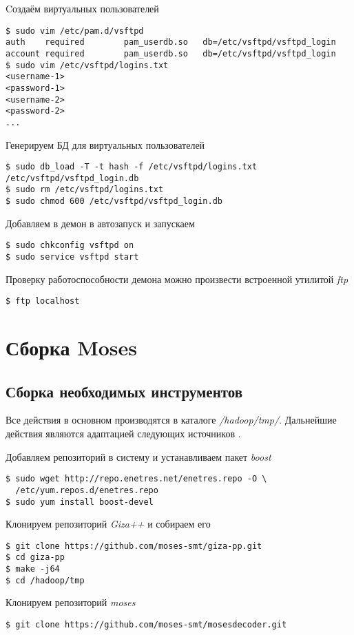 Cоздаём виртуальных пользователей
\begin{lstlisting}
$ sudo vim /etc/pam.d/vsftpd
auth    required        pam_userdb.so   db=/etc/vsftpd/vsftpd_login
account required        pam_userdb.so   db=/etc/vsftpd/vsftpd_login
$ sudo vim /etc/vsftpd/logins.txt
<username-1>
<password-1>
<username-2>
<password-2>
...
\end{lstlisting}

Генерируем БД для виртуальных пользователей
\begin{lstlisting}
$ sudo db_load -T -t hash -f /etc/vsftpd/logins.txt /etc/vsftpd/vsftpd_login.db
$ sudo rm /etc/vsftpd/logins.txt
$ sudo chmod 600 /etc/vsftpd/vsftpd_login.db
\end{lstlisting}

Добавляем в демон в автозапуск и запускаем
\begin{lstlisting}
$ sudo chkconfig vsftpd on
$ sudo service vsftpd start
\end{lstlisting}

Проверку работоспособности демона можно произвести встроенной утилитой \emph{ftp}
\begin{lstlisting}
$ ftp localhost
\end{lstlisting}

\section{Сборка Moses}
\subsection{Сборка необходимых инструментов}
Все действия в основном производятся в каталоге \emph{/hadoop/tmp/}. 
Дальнейшие действия являются адаптацией следующих источников \cite{moses:baseline, moses:dev}.

Добавляем репозиторий в систему и устанавливаем пакет \emph{boost}
\begin{lstlisting}
$ sudo wget http://repo.enetres.net/enetres.repo -O \
  /etc/yum.repos.d/enetres.repo
$ sudo yum install boost-devel
\end{lstlisting}

Клонируем репозиторий \emph{Giza++} и собираем его
\begin{lstlisting}
$ git clone https://github.com/moses-smt/giza-pp.git
$ cd giza-pp
$ make -j64
$ cd /hadoop/tmp
\end{lstlisting}

Клонируем репозиторий \emph{moses}
\begin{lstlisting}
$ git clone https://github.com/moses-smt/mosesdecoder.git
\end{lstlisting}

